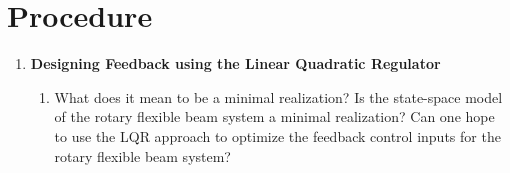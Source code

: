 \section{Procedure}
\begin{enumerate}

    \item \textbf{Designing Feedback using the Linear Quadratic Regulator}\label{section:lab4_lqr}

          \begin{enumerate}
              \item What does it mean to be a minimal realization? Is the state-space model of the rotary flexible beam system a minimal realization? Can one hope to use the LQR approach to optimize the feedback control inputs for the rotary flexible beam system?


\end{enumerate}
\end{enumerate}
